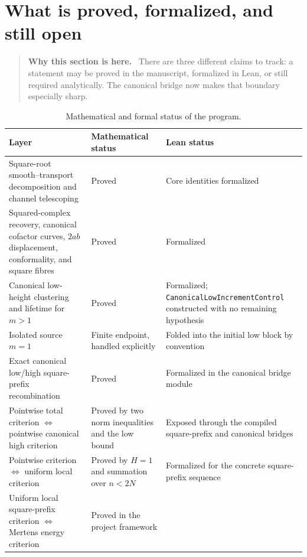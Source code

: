\documentclass[11pt]{article}
\theoremstyle{definition}
\theoremstyle{remark}
\newcommand{\1}{\mathbf{1}}
\newenvironment{motivation}
  {\begin{quote}\small\color{ovvogray}\textbf{Why this section is here.}\ }
  {\end{quote}}
\begin{document}
\section{What is proved, formalized, and still open}
\label{sec:status}

\begin{motivation}
There are three different claims to track: a statement may be proved in the manuscript, formalized in Lean, or still required analytically.  The canonical bridge now makes that boundary especially sharp.
\end{motivation}

\begin{table}[htbp]
\centering
\caption{Mathematical and formal status of the program.}
\label{tab:status}
\small
\renewcommand{\arraystretch}{1.20}
\begin{tabular}{>{\raggedright\arraybackslash}p{}
                >{\raggedright\arraybackslash}p{}
                >{\raggedright\arraybackslash}p{}}
\toprule
Layer & Mathematical status & Lean status\\
\midrule
Square-root smooth--transport decomposition and channel telescoping
& Proved
& Core identities formalized\\
Squared-complex recovery, canonical cofactor curves, $2ab$ displacement, conformality, and square fibres
& Proved
& Formalized\\
Canonical low-height clustering and lifetime for $m>1$
& Proved
& Formalized; \texttt{CanonicalLowIncrementControl} constructed with no remaining hypothesis\\
Isolated source $m=1$
& Finite endpoint, handled explicitly
& Folded into the initial low block by convention\\
Exact canonical low/high square-prefix recombination
& Proved
& Formalized in the canonical bridge module\\
Pointwise total criterion $\Longleftrightarrow$ pointwise canonical high criterion
& Proved by two norm inequalities and the low bound
& Exposed through the compiled square-prefix and canonical bridges\\
Pointwise criterion $\Longleftrightarrow$ uniform local criterion
& Proved by $H=1$ and summation over $n<2N$
& Formalized for the concrete square-prefix sequence\\
Uniform local square-prefix criterion $\Longleftrightarrow$ Mertens energy criterion
& Proved in the project framework

\end{tabular}
\end{table}
\end{document}
